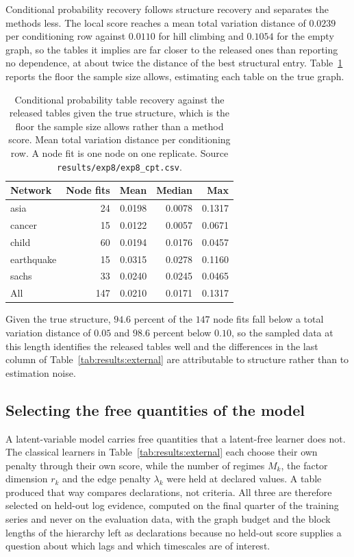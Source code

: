 Conditional probability recovery follows structure recovery and separates the
methods less. The local score reaches a mean total variation distance of
$0.0239$ per conditioning row against $0.0110$ for hill climbing and $0.1054$
for the empty graph, so the tables it implies are far closer to the released
ones than reporting no dependence, at about twice the distance of the best
structural entry. Table~\ref{tab:results:cpt} reports the floor the sample
size allows, estimating each table on the true graph.

\begin{table}[t]
\centering
\caption{Conditional probability table recovery against the released tables
given the true structure, which is the floor the sample size allows rather than
a method score. Mean total variation distance per conditioning row. A node fit
is one node on one replicate. Source \texttt{results/exp8/exp8\_cpt.csv}.}
\label{tab:results:cpt}
\begin{tabular}{lrrrr}
\toprule
Network & Node fits & Mean & Median & Max \\
\midrule
asia       & 24 & 0.0198 & 0.0078 & 0.1317 \\
cancer     & 15 & 0.0122 & 0.0057 & 0.0671 \\
child      & 60 & 0.0194 & 0.0176 & 0.0457 \\
earthquake & 15 & 0.0315 & 0.0278 & 0.1160 \\
sachs      & 33 & 0.0240 & 0.0245 & 0.0465 \\
\midrule
All        & 147 & 0.0210 & 0.0171 & 0.1317 \\
\bottomrule
\end{tabular}
\end{table}

Given the true structure, $94.6$ percent of the $147$ node fits fall below a
total variation distance of $0.05$ and $98.6$ percent below $0.10$, so the
sampled data at this length identifies the released tables well and the
differences in the last column of Table~\ref{tab:results:external} are
attributable to structure rather than to estimation noise.

\subsection{Selecting the free quantities of the model}
\label{sec:results:selection}

A latent-variable model carries free quantities that a latent-free learner does
not. The classical learners in Table~\ref{tab:results:external} each choose
their own penalty through their own score, while the number of regimes $M_k$,
the factor dimension $r_k$ and the edge penalty $\lambda_k$ were held at
declared values. A table produced that way compares declarations, not criteria.
All three are therefore selected on held-out log evidence, computed on the
final quarter of the training series and never on the evaluation data, with the
graph budget and the block lengths of the hierarchy left as declarations
because no held-out score supplies a question about which lags and which
timescales are of interest.

